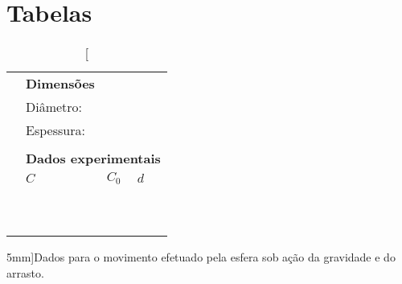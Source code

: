 \vfill
\pagebreak
\section{Tabelas}

\begin{table*}[!h]
\centering
\begin{tabular}{lp{25mm}p{25mm}p{25mm}l}
\toprule
	& \multicolumn{2}{l}{\textbf{Dimensões}} \\
	\cmidrule{2-3}
	& Diâmetro: \cellcolor[gray]{0.89} & \cellcolor[gray]{0.92} \\
	& Espessura: \cellcolor[gray]{0.95} & \cellcolor[gray]{0.97} \\
	\cmidrule{2-3}
\\
	& \multicolumn{4}{l}{\textbf{Dados experimentais}} \\
	\cmidrule{2-4}
	& $C$ & $C_0$ & $d$ & \\
	\cmidrule{2-4}
	& \cellcolor[gray]{0.89} & \cellcolor[gray]{0.92} & \cellcolor[gray]{0.89} & \\
	& \cellcolor[gray]{0.95} & \cellcolor[gray]{0.97} & \cellcolor[gray]{0.95} & \\
	& \cellcolor[gray]{0.89} & \cellcolor[gray]{0.92} & \cellcolor[gray]{0.89} & \\
	& \cellcolor[gray]{0.95} & \cellcolor[gray]{0.97} & \cellcolor[gray]{0.95} & \\
	& \cellcolor[gray]{0.89} & \cellcolor[gray]{0.92} & \cellcolor[gray]{0.89} & \\
	& \cellcolor[gray]{0.95} & \cellcolor[gray]{0.97} & \cellcolor[gray]{0.95} & \\
	& \cellcolor[gray]{0.89} & \cellcolor[gray]{0.92} & \cellcolor[gray]{0.89} & \\
	& \cellcolor[gray]{0.95} & \cellcolor[gray]{0.97} & \cellcolor[gray]{0.95} & \\
	& \cellcolor[gray]{0.89} & \cellcolor[gray]{0.92} & \cellcolor[gray]{0.89} & \\
	& \cellcolor[gray]{0.95} & \cellcolor[gray]{0.97} & \cellcolor[gray]{0.95} & \\
	\cmidrule{2-4}
\bottomrule
\end{tabular}
\caption[][5mm]{Dados para o movimento efetuado pela esfera sob ação da gravidade e do arrasto.}
\label{Tab:ValoresCapacitancia}
\end{table*}


